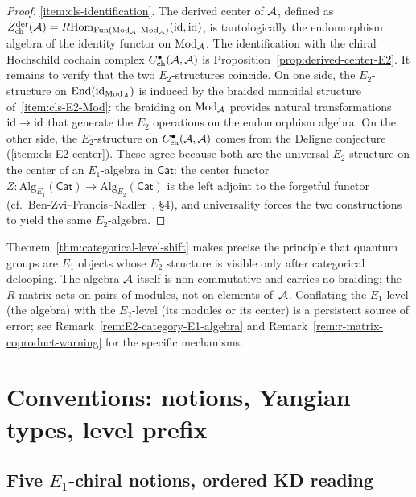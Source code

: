 \begin{proof}
\medskip
\noindent\ref{item:cls-identification}.
The derived center of $\mathcal{A}$, defined as
$Z^{\mathrm{der}}_{\mathrm{ch}}(\mathcal{A})
= R\!\operatorname{Hom}_{\mathrm{Fun}(\mathrm{Mod}_{\mathcal{A}},\,
\mathrm{Mod}_{\mathcal{A}})}(\mathrm{id}, \mathrm{id})$,
is tautologically the endomorphism algebra of the identity
functor on $\mathrm{Mod}_{\mathcal{A}}$. The identification with the
chiral Hochschild cochain complex
$C^\bullet_{\mathrm{ch}}(\mathcal{A}, \mathcal{A})$ is
Proposition~\ref{prop:derived-center-E2}.
It remains to verify that the two $E_2$-structures
coincide. On one side, the $E_2$-structure on
$\mathrm{End}(\mathrm{id}_{\mathrm{Mod}_{\mathcal{A}}})$ is induced by
the braided monoidal structure of~\ref{item:cls-E2-Mod}:
the braiding on $\mathrm{Mod}_{\mathcal{A}}$ provides natural
transformations $\mathrm{id} \to \mathrm{id}$ that generate the $E_2$
operations on the endomorphism algebra. On the other side,
the $E_2$-structure on
$C^\bullet_{\mathrm{ch}}(\mathcal{A}, \mathcal{A})$
comes from the Deligne conjecture
(\ref{item:cls-E2-center}). These agree because both are
the universal $E_2$-structure on the center of an
$E_1$-algebra in $\mathsf{Cat}$: the center functor
$Z \colon \mathrm{Alg}_{E_1}(\mathsf{Cat}) \to
\mathrm{Alg}_{E_2}(\mathsf{Cat})$
is the left adjoint to the forgetful functor (cf.\
Ben-Zvi--Francis--Nadler~\cite{BZFN10}, \S4), and
universality forces the two constructions to yield the
same $E_2$-algebra.
\end{proof}

\begin{remark}%
\label{rem:E2-never-on-A}%
%
Theorem~\ref{thm:categorical-level-shift} makes precise
the principle that quantum groups are $E_1$ objects whose
$E_2$ structure is visible only after categorical
delooping. The algebra $\mathcal{A}$ itself is non-commutative
and carries no braiding; the $R$-matrix acts on pairs of
modules, not on elements of~$\mathcal{A}$. Conflating the
$E_1$-level (the algebra) with the $E_2$-level (its
modules or its center) is a persistent source of error;
see Remark~\textup{\ref{rem:E2-category-E1-algebra}}
and Remark~\textup{\ref{rem:r-matrix-coproduct-warning}}
for the specific mechanisms.
\end{remark}

\section{Conventions: notions, Yangian types, level prefix}
\label{sec:ordered-kd-core-conventions}

\subsection{Five $E_1$-chiral notions, ordered KD reading}
\label{subsec:ordered-kd-core-five-notions}

